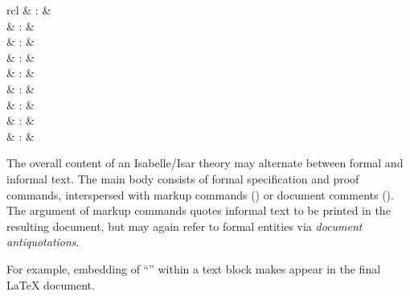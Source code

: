 \begin{isabellebody}
\begin{isamarkuptext}
\begin{matharray}{rcl}
    \hypertarget{antiquotation.class}{\hyperlink{antiquotation.class}{\mbox{}}} & : &  \\
    \hypertarget{antiquotation.text}{\hyperlink{antiquotation.text}{\mbox{}}} & : &  \\
    \hypertarget{antiquotation.goals}{\hyperlink{antiquotation.goals}{\mbox{}}} & : &  \\
    \hypertarget{antiquotation.subgoals}{\hyperlink{antiquotation.subgoals}{\mbox{}}} & : &  \\
    \hypertarget{antiquotation.prf}{\hyperlink{antiquotation.prf}{\mbox{}}} & : &  \\
    \hypertarget{antiquotation.full-prf}{\hyperlink{antiquotation.full-prf}{\mbox{}}} & : &  \\
    \hypertarget{antiquotation.ML}{\hyperlink{antiquotation.ML}{\mbox{}}} & : &  \\
    \hypertarget{antiquotation.ML-type}{\hyperlink{antiquotation.ML-type}{\mbox{}}} & : &  \\
    \hypertarget{antiquotation.ML-struct}{\hyperlink{antiquotation.ML-struct}{\mbox{}}} & : &  \\
  \end{matharray}

  The overall content of an Isabelle/Isar theory may alternate between
  formal and informal text.  The main body consists of formal
  specification and proof commands, interspersed with markup commands
  () or document comments ().
  The argument of markup commands quotes informal text to be printed
  in the resulting document, but may again refer to formal entities
  via \emph{document antiquotations}.

  For example, embedding of ``''
  within a text block makes
   appear in the final {\LaTeX} document.


\end{isamarkuptext}
\end{isabellebody}
